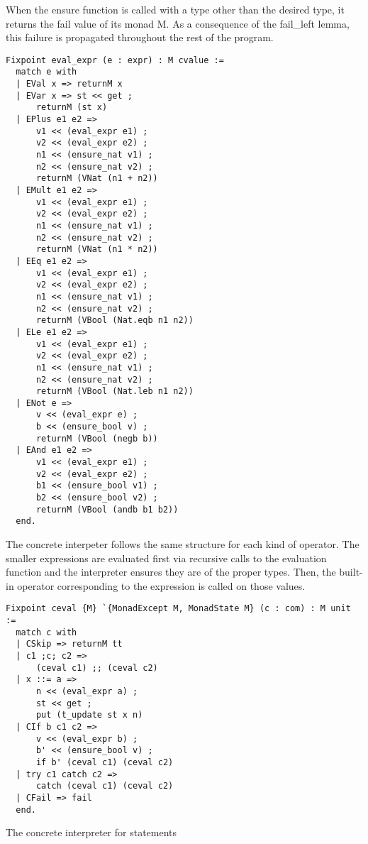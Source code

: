 When the ensure function is called with a type other than the desired type, it
returns the fail value of its monad M. As a consequence of the
fail\_left lemma, this failure is propagated throughout the rest of the
program.

\begin{listing}[H]
\begin{verbatim}
Fixpoint eval_expr (e : expr) : M cvalue :=
  match e with
  | EVal x => returnM x
  | EVar x => st << get ;
      returnM (st x)
  | EPlus e1 e2 => 
      v1 << (eval_expr e1) ;
      v2 << (eval_expr e2) ;
      n1 << (ensure_nat v1) ;
      n2 << (ensure_nat v2) ;
      returnM (VNat (n1 + n2))
  | EMult e1 e2 =>
      v1 << (eval_expr e1) ;
      v2 << (eval_expr e2) ;
      n1 << (ensure_nat v1) ;
      n2 << (ensure_nat v2) ;
      returnM (VNat (n1 * n2))
  | EEq e1 e2 =>
      v1 << (eval_expr e1) ;
      v2 << (eval_expr e2) ;
      n1 << (ensure_nat v1) ;
      n2 << (ensure_nat v2) ;
      returnM (VBool (Nat.eqb n1 n2))
  | ELe e1 e2 =>
      v1 << (eval_expr e1) ;
      v2 << (eval_expr e2) ;
      n1 << (ensure_nat v1) ;
      n2 << (ensure_nat v2) ;
      returnM (VBool (Nat.leb n1 n2))
  | ENot e =>
      v << (eval_expr e) ;
      b << (ensure_bool v) ;
      returnM (VBool (negb b))
  | EAnd e1 e2 =>
      v1 << (eval_expr e1) ;
      v2 << (eval_expr e2) ;
      b1 << (ensure_bool v1) ;
      b2 << (ensure_bool v2) ;
      returnM (VBool (andb b1 b2))
  end.
\end{verbatim}
\end{listing}

The concrete interpeter follows the same structure for each kind of operator.
The smaller expressions are evaluated first via recursive calls to the
evaluation function and the interpreter
ensures they are of the proper types. Then, the built-in operator corresponding
to the expression is called on those values.

\begin{listing}[H]
\begin{verbatim}
Fixpoint ceval {M} `{MonadExcept M, MonadState M} (c : com) : M unit :=
  match c with
  | CSkip => returnM tt
  | c1 ;c; c2 => 
      (ceval c1) ;; (ceval c2)
  | x ::= a => 
      n << (eval_expr a) ;
      st << get ;
      put (t_update st x n)
  | CIf b c1 c2 => 
      v << (eval_expr b) ;
      b' << (ensure_bool v) ;
      if b' (ceval c1) (ceval c2)
  | try c1 catch c2 =>
   	  catch (ceval c1) (ceval c2)
  | CFail => fail
  end.
\end{verbatim}
\caption{The concrete interpreter for statements}
\label{lst:concrete_statements}
\end{listing}


